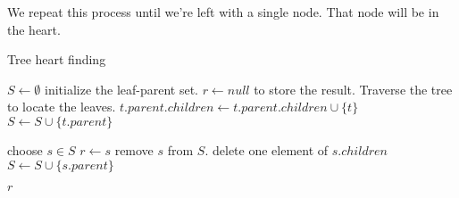 \documentclass{article}
\begin{document}
We repeat this process until we're left with a single node. That node will be
in the heart.


\begin{algorithm}
    \caption{Tree heart finding}
    \begin{algorithmic}
            \State $S \gets \emptyset$ \Comment initialize the leaf-parent set.
            \State $r \gets null$ \Comment to store the result.
             \Comment Traverse the tree to locate the leaves.
                    \State $t.parent.children \gets t.parent.children \cup \{t\}$
                    \State $S \gets S \cup \{t.parent\}$
                \EndIf
            \EndFor

                \State choose $s \in S$
                    \State $r \gets s$
                    \State remove $s$ from $S$.
                \Else
                    \State delete one element of $s.children$
                        \State $S \gets S \cup \{s.parent\}$
                    \EndIf
                \EndIf
            \EndWhile

            \State \Return $r$
        \EndFunction
    \end{algorithmic}
\end{algorithm}
\end{document}
